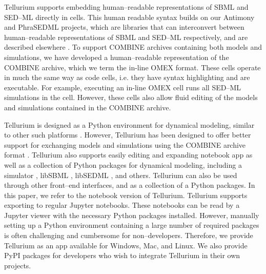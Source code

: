 \documentclass[10pt,letterpaper]{article}
\begin{document}
Tellurium supports embedding human--readable representations of SBML \cite{smith2009antimony} and SED--ML \cite{choi2016phrased} directly in cells. This human readable syntax builds on our Antimony and PhraSEDML projects, which are libraries that can interconvert between human--readable representations of SBML and SED--ML respectively, and are described elsewhere \cite{smith2009antimony,choi2016phrased}. To support COMBINE archives containing both models and simulations, we have developed a human--readable representation of the COMBINE archive, which we term the in-line OMEX format. These cells operate in much the same way as code cells, i.e. they have syntax highlighting and are executable. For example, executing an in-line OMEX cell runs all SED--ML simulations in the cell. However, these cells also allow fluid editing of the models and simulations contained in the COMBINE archive.

Tellurium is designed as a Python environment for dynamical modeling, similar to other such platforms \cite{olivier2005modelling}. However, Tellurium has been designed to offer better support for exchanging models and simulations using the COMBINE archive format \cite{bergmann2014combine}.
Tellurium also supports easily editing and expanding notebook app as well as a collection of Python packages for dynamical modeling, including a simulator \cite{somogyi2015libroadrunner}, libSBML \cite{bornstein2008libsbml}, libSEDML \cite{waltemath2011reproducible}, and others. Tellurium can also be used through other front--end interfaces, and as a collection of a Python packages. In this paper, we refer to the notebook version of Tellurium. Tellurium supports exporting to regular Jupyter notebooks. These notebooks can be read by a Jupyter viewer with the necessary Python packages installed. However, manually setting up a Python environment containing a large number of required packages is often challenging and cumbersome for non--developers. Therefore, we provide Tellurium as an app available for Windows, Mac, and Linux. We also provide PyPI packages for developers who wish to integrate Tellurium in their own projects.

\end{document}
